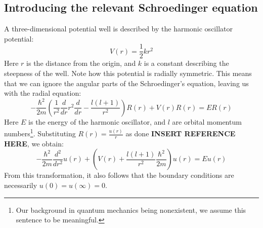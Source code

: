 \documentclass[a4paper, 10pt]{article}
\begin{document}
\subsection{Introducing the relevant Schroedinger equation}
A three-dimensional potential well is described by the harmonic oscillator potential:
\begin{equation}
V(r)=\frac{1}{2}kr^2
\end{equation} 
Here $r$ is the distance from the origin, and $k$ is a constant describing the steepness of the well. Note how this potential is radially symmetric. This means that we can ignore the angular parts of the Schroedinger's equation, leaving us with the radial equation:
\begin{equation}
-\frac{\hbar^2}{2m}\left(\frac{1}{r^2}\frac{d}{dr}r^2 \frac{d}{dr}-\frac{l(l+1)}{r^2}\right)R(r)+V(r)R(r)=ER(r)
\end{equation}
Here $E$ is the energy of the harmonic oscillator, and $l$ are orbital momentum numbers\footnote{Our background in quantum mechanics being nonexistent, we assume this sentence to be meaningful.}. Substituting $R(r)=\frac{u(r)}{r}$ as done \textbf{INSERT REFERENCE HERE}, we obtain:
\begin{equation}\label{eq:Radial_Schroedinger}
-\frac{\hbar^2}{2m}\frac{d^2}{dr^2}u(r)+\left(V(r)+\frac{l(l+1)}{r^2}\frac{\hbar^2}{2m}\right)u(r)=Eu(r)
\end{equation}
From this transformation, it also follows that the boundary conditions are necessarily $u(0)=u(\infty)=0$.
\end{document}
